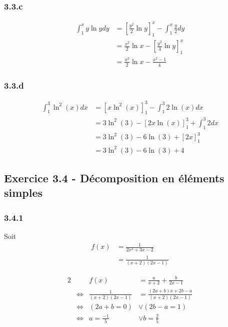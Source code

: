 \documentclass[a4paper,10pt]{report}
\begin{document}
\subsubsection*{3.3.c}
\begin{equation*}
	\begin{split}
		\int_1^x y \ln y dy &= \left[ \frac{y^2}{2} \ln y \right]_1^x - \int_1^x \frac{y}{2} dy \\
		                    &= \frac{x^2}{2} \ln x - \left[ \frac{y^2}{4} \ln y \right]_1^x \\
		                    &= \frac{x^2}{2} \ln x - \frac{x^2 -1}{4}
	\end{split}
\end{equation*}

\subsubsection*{3.3.d}
\begin{equation*}
	\begin{split}
		\int_1^3 \ln^2(x) dx &= \left[ x \ln^2(x) \right]_1^3 - \int_1^3 2\ln(x) dx \\
		                     &= 3 \ln^2(3) - \left[ 2x \ln(x) \right]_1^3 +  \int_1^3 2 dx \\
		                     &= 3 \ln^2(3) -6 \ln(3) + \left[ 2x \right]_1^3 \\
		                     &= 3 \ln^2(3) -6 \ln(3) + 4
	\end{split}
\end{equation*}

\subsection*{Exercice 3.4 - Décomposition en éléments simples}

\subsubsection*{3.4.1}
Soit 
\begin{equation*}
	\begin{split}
		f(x) &= \frac{1}{2x^2 + 3x -2} \\
		       &= \frac{1}{(x+2)(2x-1)} 
	\end{split}
\end{equation*}


\begin{alignat*}{2}
 &                     &                f(x) &= \frac{a}{x+2} +  \frac{b}{2x-1}\\
 & \Longleftrightarrow & \frac{1}{(x+2)(2x-1)} &= \frac{(2a+b)x + 2b -a}{(x+2)(2x-1)} \\
 & \Longleftrightarrow & (2a+b =0)             &\vee (2b-a = 1) \\
 & \Longleftrightarrow & a=\frac{-1}{5}        &\vee b = \frac{2}{5}
\end{alignat*}
\end{document}
